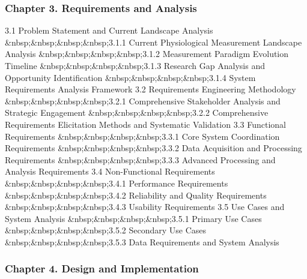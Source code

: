 \documentclass[11pt,a4paper]{report}
\begin{document}
\subsubsection{Chapter 3. Requirements and Analysis}

3.1 Problem Statement and Current Landscape Analysis
\&nbsp;\&nbsp;\&nbsp;\&nbsp;3.1.1 Current Physiological Measurement Landscape Analysis
\&nbsp;\&nbsp;\&nbsp;\&nbsp;3.1.2 Measurement Paradigm Evolution Timeline
\&nbsp;\&nbsp;\&nbsp;\&nbsp;3.1.3 Research Gap Analysis and Opportunity Identification
\&nbsp;\&nbsp;\&nbsp;\&nbsp;3.1.4 System Requirements Analysis Framework
3.2 Requirements Engineering Methodology
\&nbsp;\&nbsp;\&nbsp;\&nbsp;3.2.1 Comprehensive Stakeholder Analysis and Strategic Engagement
\&nbsp;\&nbsp;\&nbsp;\&nbsp;3.2.2 Comprehensive Requirements Elicitation Methods and Systematic Validation
3.3 Functional Requirements
\&nbsp;\&nbsp;\&nbsp;\&nbsp;3.3.1 Core System Coordination Requirements
\&nbsp;\&nbsp;\&nbsp;\&nbsp;3.3.2 Data Acquisition and Processing Requirements
\&nbsp;\&nbsp;\&nbsp;\&nbsp;3.3.3 Advanced Processing and Analysis Requirements
3.4 Non-Functional Requirements
\&nbsp;\&nbsp;\&nbsp;\&nbsp;3.4.1 Performance Requirements
\&nbsp;\&nbsp;\&nbsp;\&nbsp;3.4.2 Reliability and Quality Requirements
\&nbsp;\&nbsp;\&nbsp;\&nbsp;3.4.3 Usability Requirements
3.5 Use Cases and System Analysis
\&nbsp;\&nbsp;\&nbsp;\&nbsp;3.5.1 Primary Use Cases
\&nbsp;\&nbsp;\&nbsp;\&nbsp;3.5.2 Secondary Use Cases
\&nbsp;\&nbsp;\&nbsp;\&nbsp;3.5.3 Data Requirements and System Analysis

\subsubsection{Chapter 4. Design and Implementation}
\end{document}

